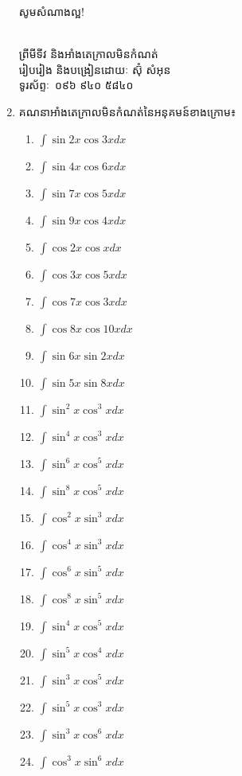 \documentclass[12pt, a4paper]{article}
\begin{document}
\begin{enumerate}[m]
\begin{enumerate}[k, 4]
	\end{enumerate}
	\begin{center}
		\sffamily\color{black}
		សូមសំណាងល្អ!
	\end{center}\newpage
	\begin{center}
		\sffamily\color{black}
		\\
		ព្រីមីទីវ និងអាំងតេក្រាលមិនកំណត់ \\
		រៀបរៀង និងបង្រៀនដោយៈ ស៊ុំ សំអុន\\
		ទូរស័ព្ទៈ ០៩៦ ៩៤០	៥៨៤០
	\end{center}
	\item គណនាអាំងតេក្រាលមិនកំណត់នៃអនុគមន៍ខាងក្រោម៖
		\begin{enumerate}[k, 3]
			\item $\int \sin2x\cos3x dx$
			\item $\int \sin4x\cos6x dx$
			\item $\int \sin7x\cos5x dx$
			\item $\int \sin9x\cos4x dx$
			\item $\int \cos2x\cos x dx$
			\item $\int \cos3x\cos5x dx$
			\item $\int \cos7x\cos3x dx$
			\item $\int \cos8x\cos10x dx$
			\item $\int \sin6x\sin2x dx$
			\item $\int \sin5x\sin8x dx$
			\item $\int \sin^2x\cos^3x dx$
			\item $\int \sin^4x\cos^3x dx$
			\item $\int \sin^6x\cos^5x dx$
			\item $\int \sin^8x\cos^5x dx$
			\item $\int \cos^2x\sin^3x dx$
			\item $\int \cos^4x\sin^3x dx$
			\item $\int \cos^6x\sin^5x dx$
			\item $\int \cos^8x\sin^5x dx$
			\item $\int \sin^4x\cos^5x dx$
			\item $\int \sin^5x\cos^4x dx$
			\item $\int \sin^3x\cos^5x dx$
			\item $\int \sin^5x\cos^3x dx$
			\item $\int \sin^3x\cos^6x dx$
			\item $\int \cos^3x\sin^6x dx$

\end{enumerate}
\end{enumerate}
\end{document}
